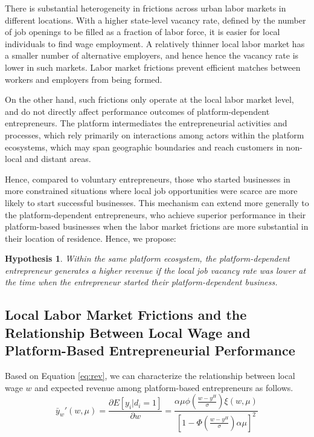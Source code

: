 \documentclass[letterpaper,12pt]{article}
\newtheorem{hypothesis}{Hypothesis}
\begin{document}
There is substantial heterogeneity in frictions across urban labor markets in different locations. With a higher state-level vacancy rate, defined by the number of job openings to be filled as a fraction of labor force, it is easier for local individuals to find wage employment. A relatively thinner local labor market has a smaller number of alternative employers, and hence hence the vacancy rate is lower in such markets. Labor market frictions prevent efficient matches between workers and employers from being formed.

On the other hand, such frictions only operate at the local labor market level, and do not directly affect performance outcomes of platform-dependent entrepreneurs. The platform intermediates the entrepreneurial activities and processes, which rely primarily on interactions among actors within the platform ecosystems, which may span geographic boundaries and reach customers in non-local and distant areas. 

Hence, compared to voluntary entrepreneurs, those who started businesses in more constrained situations where local job opportunities were scarce are more likely to start successful businesses. This mechanism can extend more generally to the platform-dependent entrepreneurs, who achieve superior performance in their platform-based businesses when the labor market frictions are more substantial in their location of residence. Hence, we propose:
\begin{hypothesis}
Within the same platform ecosystem, the platform-dependent entrepreneur generates a higher revenue if the local job vacancy rate was lower at the time when the entrepreneur started their platform-dependent business.
\end{hypothesis}

\subsection{Local Labor Market Frictions and the Relationship Between Local Wage and Platform-Based Entrepreneurial Performance}

Based on Equation \ref{eq:rev}, we can characterize the relationship between local wage $w$ and expected revenue among platform-based entrepreneurs as follows. 
\begin{equation}
\bar{y}_{w}'(w,\mu) = \frac{\partial E\left[y_{i}\vert d_{i}=1\right]}{\partial w} = \frac{\alpha\mu\phi\left(\frac{w-y^{H}}{\sigma}\right)\xi(w,\mu)}{\left[1-\Phi\left(\frac{w-y^{H}}{\sigma}\right)\alpha\mu\right]^{2}}
\end{equation}
\end{document}
